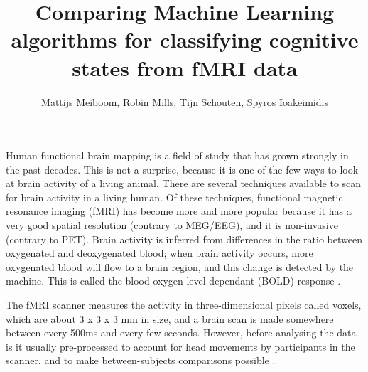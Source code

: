 \documentclass[preprint,journal,11pt]{vgtc}
\title{Comparing Machine Learning algorithms for classifying cognitive states from fMRI data}
\author{Mattijs Meiboom, Robin Mills, Tijn Schouten, Spyros Ioakeimidis}
\begin{document}
\label{sec:introduction}
\maketitle
Human functional brain mapping is a field of study that has grown strongly in the past decades. This is not a surprise, because it is one of the few ways to look at brain activity of a living animal. There are several techniques available to scan for brain activity in a living human. Of these techniques, functional magnetic resonance imaging (fMRI) has become more and more popular because it has a very good spatial resolution (contrary to MEG/EEG), and it is non-invasive (contrary to PET). Brain activity is inferred from differences in the ratio between oxygenated and deoxygenated blood; when brain activity occurs, more oxygenated blood will flow to a brain region, and this change is detected by the machine. This is called the blood oxygen level dependant (BOLD) response \cite{sm:2012fMRI}.

The fMRI scanner measures the activity in three-dimensional pixels called voxels, which are about 3 x 3 x 3 mm in size, and a brain scan is made somewhere between every 500ms and every few seconds. However, before analysing the data is it usually pre-processed to account for head movements by participants in the scanner, and to make between-subjects comparisons possible \cite{sl:2009rl}.
\end{document}
